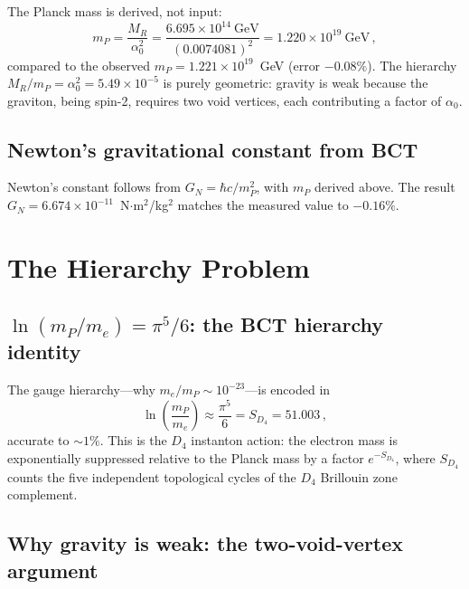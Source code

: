 \documentclass[review,number,sort&compress]{elsarticle}
\newcommand{\azero}{\alpha_0}
\newcommand{\SD}{S_{D_4}}
\newcommand{\MR}{M_R}
\newcommand{\mP}{m_P}
\newcommand{\Dfour}{D_4}
\begin{document}
The Planck mass is derived, not input:
\begin{equation}
  \mP = \frac{\MR}{\azero^2}
  = \frac{6.695 \times 10^{14}~\text{GeV}}{(0.0074081)^2}
  = 1.220 \times 10^{19}~\text{GeV}\,,
  \label{eq:mP}
\end{equation}
compared to the observed $\mP = 1.221 \times 10^{19}$~GeV
(error $-0.08\%$). The hierarchy $\MR/\mP = \azero^2 = 5.49 \times 10^{-5}$
is purely geometric: gravity is weak because the graviton, being spin-2,
requires two void vertices, each contributing a factor of $\azero$.

\subsection{Newton's gravitational constant from BCT}

Newton's constant follows from $G_N = \hbar c / \mP^2$, with $\mP$
derived above. The result $G_N = 6.674 \times 10^{-11}$~N$\cdot$m$^2$/kg$^2$
matches the measured value to $-0.16\%$.

\section{The Hierarchy Problem}
\label{sec:hierarchy}

\subsection{$\ln(m_P/m_e) = \pi^5/6$: the BCT hierarchy identity}

The gauge hierarchy---why $m_e/\mP \sim 10^{-23}$---is encoded in
\begin{equation}
  \ln\!\left(\frac{\mP}{m_e}\right) \approx \frac{\pi^5}{6} = \SD
  = 51.003\,,
  \label{eq:hierarchy}
\end{equation}
accurate to $\sim 1\%$. This is the $\Dfour$ instanton action: the
electron mass is exponentially suppressed relative to the Planck mass
by a factor $e^{-\SD}$, where $\SD$ counts the five independent
topological cycles of the $\Dfour$ Brillouin zone complement.

\subsection{Why gravity is weak: the two-void-vertex argument}
\end{document}
